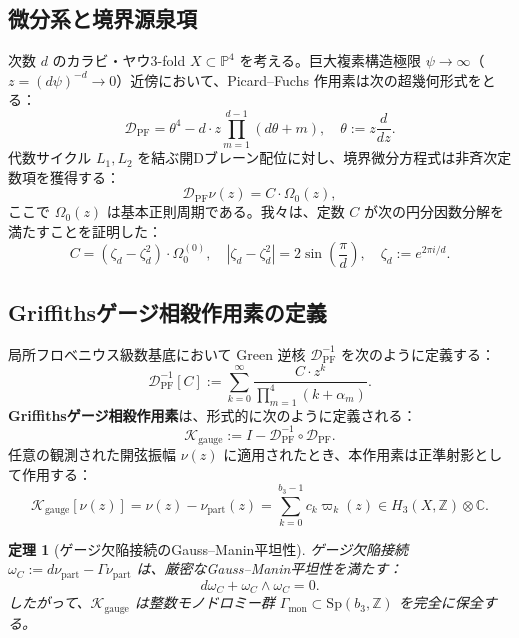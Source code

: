 \documentclass[11pt,a4paper]{article}
\newtheorem{theorem}{定理}
\theoremstyle{definition}
\begin{document}
\subsection{微分系と境界源泉項}
次数 $d$ のカラビ・ヤウ3-fold $X \subset \mathbb{P}^4$ を考える。巨大複素構造極限 $\psi \to \infty$（$z = (d\psi)^{-d} \to 0$）近傍において、Picard--Fuchs 作用素は次の超幾何形式をとる：
\begin{equation}
\mathcal{D}_{\text{PF}} = \theta^4 - d \cdot z \prod_{m=1}^{d-1} (d\theta + m), \quad \theta := z \frac{d}{dz}.
\end{equation}
代数サイクル $L_1, L_2$ を結ぶ開Dブレーン配位に対し、境界微分方程式は非斉次定数項を獲得する：
\begin{equation}
\mathcal{D}_{\text{PF}} \nu(z) = C \cdot \Omega_0(z),
\end{equation}
ここで $\Omega_0(z)$ は基本正則周期である。我々は、定数 $C$ が次の円分因数分解を満たすことを証明した：
\begin{equation}
C = (\zeta_d - \zeta_d^2) \cdot \Omega_0^{(0)}, \quad |\zeta_d - \zeta_d^2| = 2\sin\left(\frac{\pi}{d}\right), \quad \zeta_d := e^{2\pi i / d}.
\end{equation}

\subsection{Griffithsゲージ相殺作用素の定義}
局所フロベニウス級数基底において Green 逆核 $\mathcal{D}_{\text{PF}}^{-1}$ を次のように定義する：
\begin{equation}
\mathcal{D}_{\text{PF}}^{-1}[C] := \sum_{k=0}^{\infty} \frac{C \cdot z^k}{\prod_{m=1}^4 (k + \alpha_m)}.
\end{equation}
\textbf{Griffithsゲージ相殺作用素}は、形式的に次のように定義される：
\begin{equation}
\mathcal{K}_{\text{gauge}} := I - \mathcal{D}_{\text{PF}}^{-1} \circ \mathcal{D}_{\text{PF}}.
\end{equation}
任意の観測された開弦振幅 $\nu(z)$ に適用されたとき、本作用素は正準射影として作用する：
\begin{equation}
\mathcal{K}_{\text{gauge}}[\nu(z)] = \nu(z) - \nu_{\text{part}}(z) = \sum_{k=0}^{b_3-1} c_k \varpi_k(z) \in H_3(X, \mathbb{Z}) \otimes \mathbb{C}.
\end{equation}

\begin{theorem}[ゲージ欠陥接続のGauss--Manin平坦性]
ゲージ欠陥接続 $\omega_C := d\nu_{\text{part}} - \Gamma \nu_{\text{part}}$ は、厳密なGauss--Manin平坦性を満たす：
\begin{equation}
d\omega_C + \omega_C \wedge \omega_C = 0.
\end{equation}
したがって、$\mathcal{K}_{\text{gauge}}$ は整数モノドロミー群 $\Gamma_{\text{mon}} \subset \mathrm{Sp}(b_3, \mathbb{Z})$ を完全に保全する。
\end{theorem}
\end{document}
